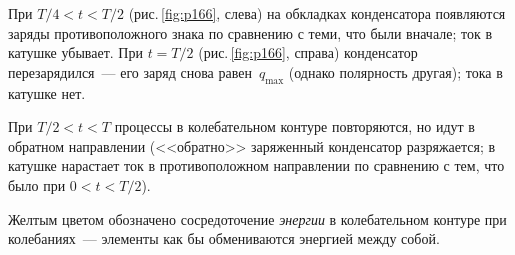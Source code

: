 \documentclass[main.tex]{subfiles}
\begin{document}
При $T/4<t<T/2$ (рис.\,\ref{fig:p166}, слева) на обкладках конденсатора появляются заряды противоположного знака по сравнению с теми, что были вначале; ток в катушке убывает. При $t=T/2$ (рис.\,\ref{fig:p166}, справа) конденсатор перезарядился~--- его заряд снова равен~$q_\text{max}$ (однако полярность другая); тока в катушке нет. 

При $T/2<t<T$ процессы в колебательном контуре повторяются, но идут в обратном направлении (<<обратно>> заряженный конденсатор разряжается; в катушке нарастает ток в противоположном направлении по сравнению с тем, что было при $0<t<T/2$).

Желтым цветом обозначено сосредоточение \emph{энергии} в колебательном контуре при колебаниях~--- элементы как бы обмениваются энергией между собой.



















 
\end{document}
